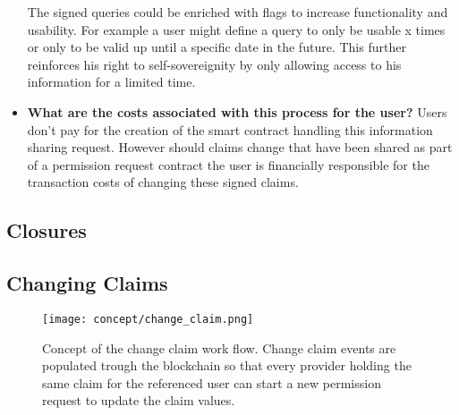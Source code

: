 \begin{itemize}
The signed queries could be enriched with flags to increase functionality and usability. For example a user might define a query to only be usable x times or only to be valid up until a specific date in the future.
This further reinforces his right to self-sovereignity by only allowing access to his information for a limited time. 
\item \label{design_pecularity_four} \textbf{What are the costs associated with this process for the user?}
Users don't pay for the creation of the smart contract handling this information sharing request. However should claims change that have been shared as part of a permission request contract the user is financially responsible for the transaction costs of changing these signed claims.
\end{itemize}




\subsection{Closures}
\begin{comment}
\begin{figure}[ht]
\centering
\texttt{[image: concept/closure.png]}
\caption{Closure}
\label{fig:closure}
\end{figure}
\end{comment}

\subsection{Changing Claims}

\begin{figure}
 \texttt{[image: concept/change\_claim.png]}
 \centering
\caption{Concept of the change claim work flow. Change claim events are populated trough the blockchain so that every provider holding the same claim for the referenced user can start a new permission request to update the claim values.}
\label{fig:changeClaimsFig}
\end{figure}

